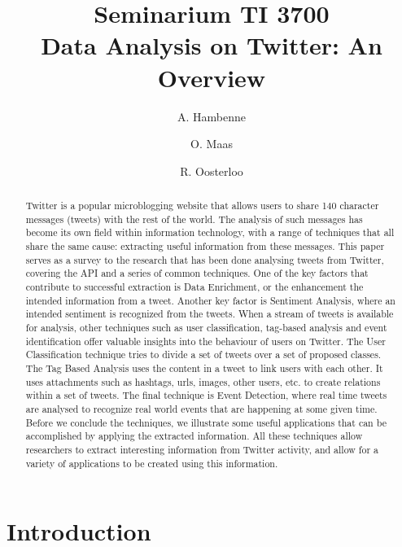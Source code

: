 \documentclass{article}
\title{Seminarium TI 3700\\ Data Analysis on Twitter: An Overview}
\author{A. Hambenne  \and
    O. Maas \and
    R. Oosterloo}
\date{}
\begin{document}
\maketitle
\thispagestyle{empty}

\begin{abstract}


Twitter is a popular microblogging website that allows users to share 140 character messages (tweets) with the rest of the world.
The analysis of such messages has become its own field within information technology, with a range of techniques that all share the same cause:
extracting useful information from these messages. This paper serves as a survey to the research that has been done analysing tweets from Twitter,
covering the API and a series of common techniques. One of the key factors that contribute to successful extraction is Data Enrichment, or the enhancement
the intended information from a tweet. Another key factor is Sentiment Analysis, where an intended sentiment is recognized from the tweets.
When a stream of tweets is available for analysis, other techniques such as user classification, tag-based analysis and event identification offer valuable
insights into the behaviour of users on Twitter. The User Classification technique tries to divide a set of tweets over a set of proposed classes. 
The Tag Based Analysis uses the content in a tweet to link users with each other. It uses attachments such as hashtags, urls, images, other users, etc. to
create relations within a set of tweets. The final technique is Event Detection, where real time tweets are analysed to recognize real world events that
are happening at some given time. Before we conclude the techniques, we illustrate some useful applications that can be accomplished by applying the extracted
information. All these techniques allow researchers to extract interesting information from Twitter activity, and allow
for a variety of applications to be created using this information.
\end{abstract}


\section{Introduction}
\end{document}

